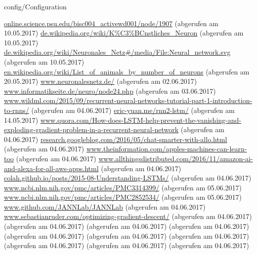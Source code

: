 \documentclass[12pt,headsepline,oneside,ngerman]{scrreprt}
\begin{document}
\graphicspath{{figures/}}

 {config/Configuration}
\pagestyle{headings}










%



%

\cleardoublepage

\begin{thebibliography}{xxxx}
\url{online.science.psu.edu/bisc004_activewd001/node/1907} (abgerufen am 10.05.2017)
\url{de.wikipedia.org/wiki/K%C3%BCnstliches_Neuron} (abgerufen am 10.05.2017)
\url{de.wikipedia.org/wiki/Neuronales_Netz#/media/File:Neural_network.svg} (abgerufen am 10.05.2017)
\url{en.wikipedia.org/wiki/List_of_animals_by_number_of_neurons} (abgerufen am 20.05.2017)
\url{www.neuronalesnetz.de/} (abgerufen am 02.06.2017)
\url{www.informatikseite.de/neuro/node24.php} (abgerufen am 03.06.2017)
\url{www.wildml.com/2015/09/recurrent-neural-networks-tutorial-part-1-introduction-to-rnns/} (abgerufen am 04.06.2017)
\url{eric-yuan.me/rnn2-lstm/} (abgerufen am 14.05.2017)
\url{www.quora.com/How-does-LSTM-help-prevent-the-vanishing-and-exploding-gradient-problem-in-a-recurrent-neural-network} (abgerufen am 04.06.2017)
\url{research.googleblog.com/2016/05/chat-smarter-with-allo.html} (abgerufen am 04.06.2017)
\url{www.theinformation.com/apples-machines-can-learn-too} (abgerufen am 04.06.2017)
\url{www.allthingsdistributed.com/2016/11/amazon-ai-and-alexa-for-all-aws-apps.html} (abgerufen am 04.06.2017)
\url{colah.github.io/posts/2015-08-Understanding-LSTMs/} (abgerufen am 04.06.2017)
\url{www.ncbi.nlm.nih.gov/pmc/articles/PMC3314399/} (abgerufen am 05.06.2017)
\url{www.ncbi.nlm.nih.gov/pmc/articles/PMC2852534/} (abgerufen am 05.06.2017)
\url{www.github.com/JANNLab/JANNLab} (abgerufen am 04.06.2017)
\url{www.sebastianruder.com/optimizing-gradient-descent/} (abgerufen am 04.06.2017)
\url{} (abgerufen am 04.06.2017)
\url{} (abgerufen am 04.06.2017)
\url{} (abgerufen am 04.06.2017)
\url{} (abgerufen am 04.06.2017)
\url{} (abgerufen am 04.06.2017)
\url{} (abgerufen am 04.06.2017)
\url{} (abgerufen am 04.06.2017)
\url{} (abgerufen am 04.06.2017)
\url{} (abgerufen am 04.06.2017)



\end{thebibliography}
\renewcommand{\bibname}{Literaturverzeichnis}

%
\end{document}
